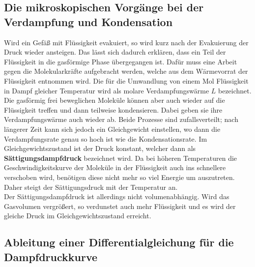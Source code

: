 \subsection{Die mikroskopischen Vorgänge bei der Verdampfung und Kondensation}
\label{sec:Die mikroskopischen Vorgänge bei der Verdampfung und Kondensation}
Wird ein Gefäß mit Flüssigkeit evakuiert, so wird kurz nach der Evakuierung der Druck
wieder ansteigen. Das lässt sich dadurch erklären, dass ein Teil der Flüssigkeit in die
gasförmige Phase übergegangen ist. Dafür muss eine Arbeit gegen die Molekularkräfte aufgebracht
werden, welche aus dem Wärmevorrat der Flüssigkeit entnommen wird. Die für die Umwandlung
von einem Mol Flüssigkeit in Dampf gleicher Temperatur wird als molare Verdampfungswärme
$L$ bezeichnet. Die gasförmig frei beweglichen Moleküle können aber auch wieder auf die
Flüssigkeit treffen und dann teilweise kondensieren. Dabei geben sie ihre
Verdampfungswärme auch wieder ab. Beide Prozesse sind zufallsverteilt; nach längerer Zeit
kann sich jedoch ein Gleichgewicht einstellen, wo dann die Verdampfungsrate genau so hoch
ist wie die Kondensationsrate. Im Gleichgewichtszustand ist der Druck konstant, welcher
dann als \textbf{Sättigungsdampfdruck} bezeichnet wird. Da bei höheren Temperaturen die
Geschwindigkeitskurve der Moleküle in der Flüssigkeit auch ins schnellere verschoben wird,
benötigen diese nicht mehr so viel Energie um auszutreten. Daher steigt der
Sättigungsdruck mit der Temperatur an. 
\\
Der Sättigungsdampfdruck ist allerdings nicht volumenabhängig. Wird das Gasvolumen
vergrößert, so verdunstet auch mehr Flüssigkeit und es wird der gleiche Druck im
Gleichgewichtszustand erreicht.

\subsection{Ableitung einer Differentialgleichung für die Dampfdruckkurve}
\label{sec:Ableitung einer Differentialgleichung für die Dampfdruckkurve}


